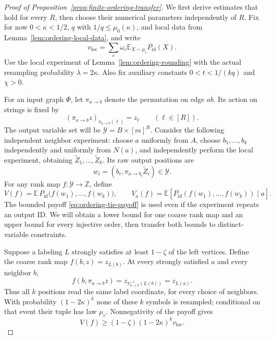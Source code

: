 \begin{proof}[Proof of Proposition~\ref{prop:finite-ordering-transfer}]
We first derive estimates that hold for every \(R\), then choose their
numerical parameters independently of \(R\).  Fix for now
\(0<\kappa<1/2\), \(q\) with \(1/q\le\mu_0(\kappa)\), and local data
from Lemma~\ref{lem:ordering-local-data}, and write
\[
 v_{\mathrm{loc}}=\sum_c\omega_c
       \mathbb E_{X\sim\mu_c}\overline{P_{\mathrm{id}}}(X).
\]
Use the local experiment of
Lemma~\ref{lem:ordering-rounding} with the actual resampling probability
\(\lambda=2\kappa\).  Also fix auxiliary constants
\(0<t<1/(kq)\) and \(\chi>0\).

For an input graph \(\Phi\), let \(\pi_{a\to b}\) denote the permutation
on edge \(ab\).  Its action on strings is fixed by
\[
 (\pi_{a\to b}z)_{\pi_{a\to b}(\ell)}=z_\ell
 \qquad(\ell\in[R]).
\]
The output variable set will be
\(\mathcal Y=B\times[m]^R\).  Consider the following independent
neighbor experiment: choose \(a\) uniformly from \(A\), choose
\(b_1,\ldots,b_k\) independently and uniformly from \(N(a)\), and
independently perform the local experiment, obtaining
\(\widetilde Z_1,\ldots,\widetilde Z_k\).  Its raw output positions are
\begin{equation}
 w_i=(b_i,\pi_{a\to b_i}\widetilde Z_i)\in\mathcal Y.
\label{eq:ordering-iid-queries}
\end{equation}
For any rank map \(f:\mathcal Y\to\mathbb Z\), define
\[
 V(f)=\mathbb E\,
   \overline{P_{\mathrm{id}}}\bigl(f(w_1),\ldots,f(w_k)\bigr),
 \qquad V_a(f)=\mathbb E[
   \overline{P_{\mathrm{id}}}(f(w_1),\ldots,f(w_k))\mid a].
\]
The bounded payoff \eqref{eq:ordering-tie-payoff} is used even if the
experiment repeats an output ID.  We will obtain a lower bound for one
coarse rank map and an upper bound for every injective order, then
transfer both bounds to distinct-variable constraints.

Suppose a labeling \(L\) strongly satisfies at least \(1-\zeta\) of
the left vertices.  Define the coarse rank map
\(f(b,z)=z_{L(b)}\).  At every strongly satisfied \(a\) and every
neighbor \(b\),
\[
 f(b,\pi_{a\to b}z)=z_{\pi_{a\to b}^{-1}(L(b))}=z_{L(a)}.
\]
Thus all \(k\) positions read the same label coordinate, for every
choice of neighbors.  With probability \((1-2\kappa)^k\) none of
these \(k\) symbols is resampled; conditional on that event their
tuple has law \(\mu_c\).  Nonnegativity of the payoff gives
\begin{equation}
 V(f)\ge (1-\zeta)(1-2\kappa)^k v_{\mathrm{loc}}.
\label{eq:ordering-iid-completeness}
\end{equation}


\end{proof}
